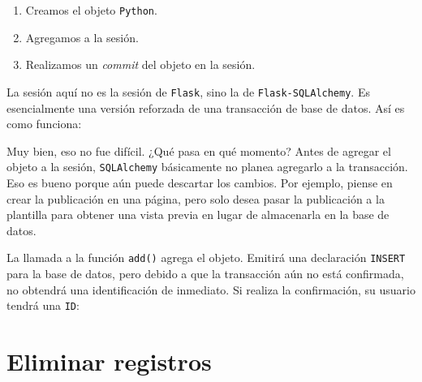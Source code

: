 \documentclass[11pt,letterpaper,notumble]{leaflet}
\begin{document}
    \begin{enumerate}
    	\item Creamos el objeto \texttt{Python}.
    	
    	\item Agregamos a la sesión.
    	
    	\item Realizamos un \textit{commit} del objeto en la sesión.
    \end{enumerate}
    
    La sesión aquí no es la sesión de \texttt{Flask}, sino la de \texttt{Flask-SQLAlchemy}. Es esencialmente una versión reforzada de una transacción de base de datos. Así es como funciona:
    
    
	
	\thispagestyle{empty}
	
	\clearpage
			
	    Muy bien, eso no fue difícil. ¿Qué pasa en qué momento? Antes de agregar el objeto a la sesión, \texttt{SQLAlchemy} básicamente no planea agregarlo a la transacción. Eso es bueno porque aún puede descartar los cambios. Por ejemplo, piense en crear la publicación en una página, pero solo desea pasar la publicación a la plantilla para obtener una vista previa en lugar de almacenarla en la base de datos.
			
	    La llamada a la función \texttt{add()} agrega el objeto. Emitirá una declaración \texttt{INSERT} para la base de datos, pero debido a que la transacción aún no está confirmada, no obtendrá una identificación de inmediato. Si realiza la confirmación, su usuario tendrá una \texttt{ID}:
			
	    
			
	    \vspace*{-0.4cm}
		
		\section{Eliminar registros}
		    
\end{document}
